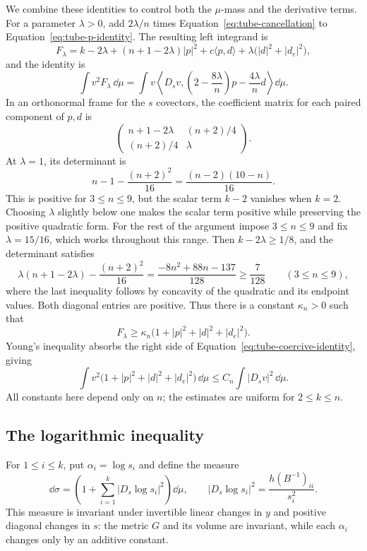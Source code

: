 We combine these identities to control both the $\mu$-mass and the
derivative terms. For a parameter $\lambda>0$, add
$2\lambda/n$ times Equation~\eqref{eq:tube-cancellation} to
Equation~\eqref{eq:tube-p-identity}.  The resulting left integrand is
\[
 F_\lambda=k-2\lambda
 +(n+1-2\lambda)|p|^2+c\langle p,d\rangle
 +\lambda\bigl(|d|^2+|d_e|^2\bigr),
\]
and the identity is
\begin{equation}\label{eq:tube-coercive-identity}
 \int v^2F_\lambda\,\dd\mu
 =\int v\left\langle D_sv,
       \left(2-\frac{8\lambda}{n}\right)p
                -\frac{4\lambda}{n}d\right\rangle\dd\mu.
\end{equation}
In an orthonormal frame for the $s$ covectors, the coefficient matrix
for each paired component of $p,d$ is
\[
 \begin{pmatrix}
 n+1-2\lambda&(n+2)/4\\
 (n+2)/4&\lambda
 \end{pmatrix}.
\]
At $\lambda=1$, its determinant is
\[
 n-1-\frac{(n+2)^2}{16}=\frac{(n-2)(10-n)}{16}.
\]
This is positive for $3\le n\le9$, but the scalar term $k-2$
vanishes when $k=2$. Choosing $\lambda$ slightly below one makes the
scalar term positive while preserving the positive quadratic form.
For the rest of the argument impose $3\le n\le9$ and fix
$\lambda=15/16$, which works throughout this range. Then
$k-2\lambda\ge1/8$, and the determinant satisfies
\[
 \lambda(n+1-2\lambda)-\frac{(n+2)^2}{16}
 =\frac{-8n^2+88n-137}{128}\ge\frac7{128}
 \qquad(3\le n\le9),
\]
where the last inequality follows by concavity of the quadratic and
its endpoint values.  Both diagonal entries are positive.  Thus there
is a constant $\kappa_n>0$ such that
\[
 F_\lambda\ge
 \kappa_n\bigl(1+|p|^2+|d|^2+|d_e|^2\bigr).
\]
Young's inequality absorbs the right side of
Equation~\eqref{eq:tube-coercive-identity}, giving
\begin{equation}\label{eq:tube-energy}
 \int v^2\bigl(1+|p|^2+|d|^2+|d_e|^2\bigr)\,\dd\mu
 \le C_n\int|D_sv|^2\,\dd\mu.
\end{equation}
All constants here depend only on $n$; the estimates are uniform for
$2\le k\le n$.

\subsection{The logarithmic inequality}

For $1\le i\le k$, put $\alpha_i=\log s_i$ and define the measure
\begin{equation}\label{eq:log-measure}
 \dd\sigma=\left(1+\sum_{i=1}^k|D_s\log s_i|^2\right)\dd\mu,
 \qquad |D_s\log s_i|^2=\frac{h(B^{-1})_{ii}}{s_i^2}.
\end{equation}
This measure is invariant under invertible linear changes in $y$ and
positive diagonal changes in $s$: the metric $G$ and its volume are
invariant, while each $\alpha_i$ changes only by an additive constant.

